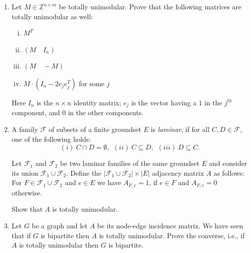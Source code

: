 \documentclass[11pt]{article}
\institute{\'Ecole Polytechnique F\'ed\'erale de Lausanne}
\newcommand{\setZ}{\mathbb{Z}}
\begin{document}
\makeheader

\begin{enumerate}[1)]

\item 
Let $M\in \setZ^{n\times m}$ be totally unimodular. Prove that the following matrices
are totally unimodular as well:
\begin{enumerate}[i)]
\item $M^T$
\item  $( M \quad I_n )$
\item $(M \quad -M)$
\item $M \cdot (I_n - 2 e_j e_j^T )$ for some $j$
\end{enumerate}
Here $I_n$ is the $n\times n$ identity matrix; $e_j$ is the vector having a $1$ in the $j^{th}$ component, and $0$ in the other components.

\item A family $\mathcal{F}$ of subsets of a finite groundset $E$ is
\emph{laminar}, if for all  $C,D\in \mathcal{F}$, one of the following holds:
$$ (i)~C\cap D = \emptyset,~~(ii)~C \subseteq D,~~(iii)~D\subseteq C. $$

Let $\mathcal{F}_1$ and $\mathcal{F}_2$ be two laminar families of the same groundset $E$ and consider its union $\mathcal{F}_1\cup\mathcal{F}_2$.
Define the $|\mathcal{F}_1\cup\mathcal{F}_2|\times |E|$ adjacency matrix $A$ as follows:
For $F\in\mathcal{F}_1\cup\mathcal{F}_2$ and $e\in E$ we have
$A_{F,e}=1$, if $e\in F$ and $A_{F,e}=0$ otherwise.

Show that $A$ is totally unimodular.

\item Let $G$ be a graph and let $A$ be its node-edge incidence matrix. We have seen that if $G$ is
bipartite then $A$ is totally unimodular. Prove the converse, i.e., if $A$ is totally unimodular then $G$
is bipartite.




\end{enumerate}
\end{document}
